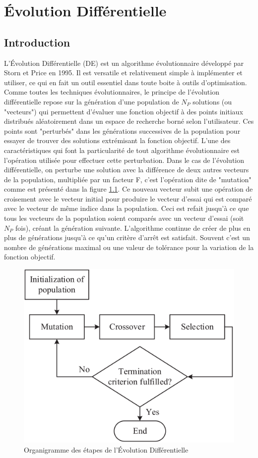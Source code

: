 \chapter{Évolution Différentielle}

\section{Introduction}

L'Évolution Différentielle (DE) est un algorithme évolutionnaire développé par Storn et Price \cite{Storn1995} en 1995. Il est versatile et relativement simple à implémenter et utiliser, ce qui en fait un outil essentiel dans toute boite à outils d'optimisation. Comme toutes les techniques évolutionnaires, le principe de l'évolution différentielle repose sur la génération d'une population de $N_P$ solutions (ou "vecteurs") qui permettent d'évaluer une fonction objectif à des points initiaux distribués aléatoirement dans un espace de recherche borné selon l'utilisateur. Ces points sont "perturbés" dans les générations successives de la population pour essayer de trouver des solutions extrémisant la fonction objectif. L'une des caractéristiques qui font la particularité de tout algorithme évolutionnaire est l'opération utilisée pour effectuer cette perturbation. Dans le cas de l'évolution différentielle, on perturbe une solution avec la différence de deux autres vecteurs de la population, multipliée par un facteur F, c'est l'opération dite de "mutation" comme est présenté dans la figure \ref{fig:deflowchart}. Ce nouveau vecteur subit une opération de croisement avec le vecteur initial pour produire le vecteur d'essai qui est comparé avec le vecteur de même indice dans la population. Ceci est refait jusqu'à ce que tous les vecteurs de la population soient comparés avec un vecteur d'essai (soit $N_P$ fois), créant la génération suivante. L'algorithme continue de créer de plus en plus de générations jusqu'à ce qu'un critère d'arrêt est satisfait. Souvent c'est un nombre de générations maximal ou une valeur de tolérance pour la variation de la fonction objectif.

\begin{figure}[H]
  \begin{center}
    \includegraphics[width=.5\textwidth]{resources/DE.png}
    \caption{Organigramme des étapes de l'Évolution Différentielle}
    \label{fig:deflowchart}
  \end{center}
\end{figure}

